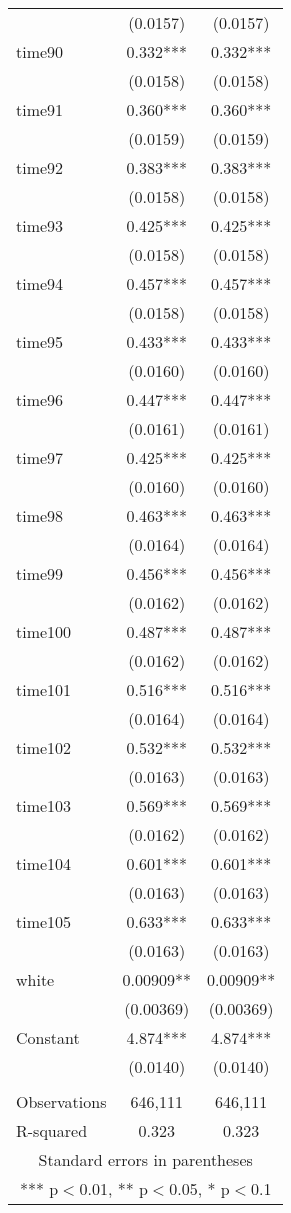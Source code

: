 \documentclass[]{article}
\begin{document}
\begin{tabular}{lcc}
 & (0.0157) & (0.0157) \\
time90 & 0.332*** & 0.332*** \\
 & (0.0158) & (0.0158) \\
time91 & 0.360*** & 0.360*** \\
 & (0.0159) & (0.0159) \\
time92 & 0.383*** & 0.383*** \\
 & (0.0158) & (0.0158) \\
time93 & 0.425*** & 0.425*** \\
 & (0.0158) & (0.0158) \\
time94 & 0.457*** & 0.457*** \\
 & (0.0158) & (0.0158) \\
time95 & 0.433*** & 0.433*** \\
 & (0.0160) & (0.0160) \\
time96 & 0.447*** & 0.447*** \\
 & (0.0161) & (0.0161) \\
time97 & 0.425*** & 0.425*** \\
 & (0.0160) & (0.0160) \\
time98 & 0.463*** & 0.463*** \\
 & (0.0164) & (0.0164) \\
time99 & 0.456*** & 0.456*** \\
 & (0.0162) & (0.0162) \\
time100 & 0.487*** & 0.487*** \\
 & (0.0162) & (0.0162) \\
time101 & 0.516*** & 0.516*** \\
 & (0.0164) & (0.0164) \\
time102 & 0.532*** & 0.532*** \\
 & (0.0163) & (0.0163) \\
time103 & 0.569*** & 0.569*** \\
 & (0.0162) & (0.0162) \\
time104 & 0.601*** & 0.601*** \\
 & (0.0163) & (0.0163) \\
time105 & 0.633*** & 0.633*** \\
 & (0.0163) & (0.0163) \\
white & 0.00909** & 0.00909** \\
 & (0.00369) & (0.00369) \\
Constant & 4.874*** & 4.874*** \\
 & (0.0140) & (0.0140) \\
 &  &  \\
Observations & 646,111 & 646,111 \\
 R-squared & 0.323 & 0.323 \\ \hline
\multicolumn{3}{c}{ Standard errors in parentheses} \\
\multicolumn{3}{c}{ *** p$<$0.01, ** p$<$0.05, * p$<$0.1} \\
\end{tabular}
\end{document}
